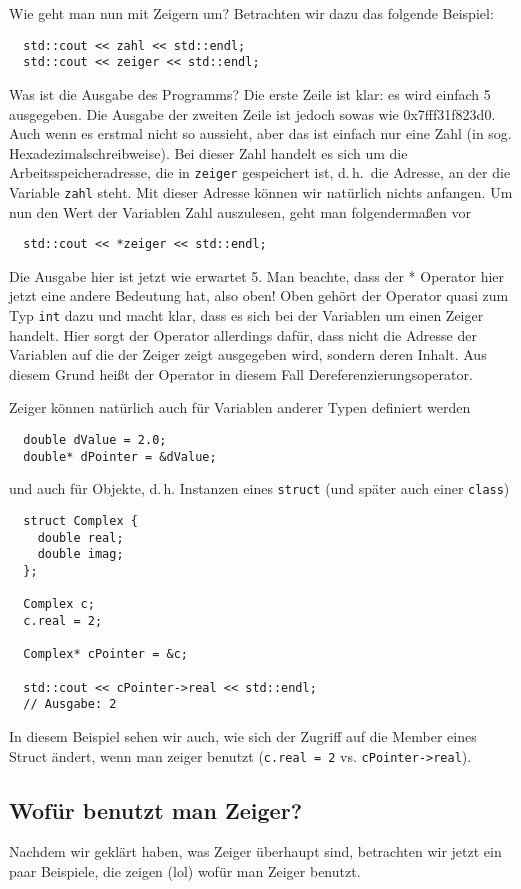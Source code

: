 \documentclass[
fontsize = 11pt,
paper    = a4,
BCOR     = 5mm,
DIV      = 12,
numbers  = noenddot,
]{scrartcl}
\begin{document}
Wie geht man nun mit Zeigern um? Betrachten wir dazu das folgende
Beispiel:
\begin{lstlisting}
  std::cout << zahl << std::endl;
  std::cout << zeiger << std::endl;
\end{lstlisting}
Was ist die Ausgabe des Programms? Die erste Zeile ist klar: es wird
einfach 5 ausgegeben. Die Ausgabe der zweiten Zeile ist jedoch sowas
wie 0x7fff31f823d0. Auch wenn es erstmal nicht so aussieht, aber das
ist einfach nur eine Zahl (in sog. Hexadezimalschreibweise). Bei
dieser Zahl handelt es sich um die Arbeitsspeicheradresse, die in
\lstinline{zeiger} gespeichert ist, d.\,h.\ die Adresse, an der die
Variable \lstinline{zahl} steht. Mit dieser Adresse können wir
natürlich nichts anfangen. Um nun den Wert der Variablen Zahl
auszulesen, geht man folgendermaßen vor
\begin{lstlisting}
  std::cout << *zeiger << std::endl;
\end{lstlisting}
Die Ausgabe hier ist jetzt wie erwartet 5. Man beachte, dass der *
Operator hier jetzt eine andere Bedeutung hat, also oben!  Oben gehört
der Operator quasi zum Typ \lstinline{int} dazu und macht klar, dass
es sich bei der Variablen um einen Zeiger handelt.  Hier sorgt der
Operator allerdings dafür, dass nicht die Adresse der Variablen auf
die der Zeiger zeigt ausgegeben wird, sondern deren Inhalt. Aus diesem
Grund heißt der Operator in diesem Fall Dereferenzierungsoperator.

Zeiger können natürlich auch für Variablen anderer Typen definiert
werden
\begin{lstlisting}
  double dValue = 2.0;
  double* dPointer = &dValue;
\end{lstlisting}
und auch für Objekte, d.\,h. Instanzen eines \lstinline{struct} (und
später auch einer \lstinline{class})
\begin{lstlisting}
  struct Complex {
    double real;
    double imag;
  };

  Complex c;
  c.real = 2;
  
  Complex* cPointer = &c;

  std::cout << cPointer->real << std::endl;
  // Ausgabe: 2
\end{lstlisting}
In diesem Beispiel sehen wir auch, wie sich der Zugriff auf die Member
eines Struct ändert, wenn man zeiger benutzt (\lstinline{c.real = 2}
vs. \lstinline{cPointer->real}).

\subsection*{Wofür benutzt man Zeiger?}
Nachdem wir geklärt haben, was Zeiger überhaupt sind, betrachten wir
jetzt ein paar Beispiele, die zeigen (lol) wofür man Zeiger benutzt.
\end{document}
